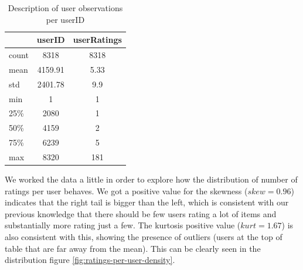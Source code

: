 \documentclass[letterpaper, 10 pt, conference]{ieeeconf}  %
\begin{document}
\begin{enumerate}
\begin{itemize}
        \begin{table}[]
        \begin{tabular}{@{}l|c|c|@{}}
        \cmidrule & \cellcolor[HTML]{DAE8FC}userID & \cellcolor[HTML]{DAE8FC}userRatings \\ \midrule
        \multicolumn{1}{|l|}{\cellcolor[HTML]{DAE8FC}count} & 8318                           & 8318                                \\ \midrule
        \multicolumn{1}{|l|}{\cellcolor[HTML]{DAE8FC}mean}  & 4159.91                        & 5.33                                \\ \midrule
        \multicolumn{1}{|l|}{\cellcolor[HTML]{DAE8FC}std}   & 2401.78                        & 9.9                                 \\ \midrule
        \multicolumn{1}{|l|}{\cellcolor[HTML]{DAE8FC}min}   & 1                              & 1                                   \\ \midrule
        \multicolumn{1}{|l|}{\cellcolor[HTML]{DAE8FC}25\%}  & 2080                           & 1                                   \\ \midrule
        \multicolumn{1}{|l|}{\cellcolor[HTML]{DAE8FC}50\%}  & 4159                           & 2                                   \\ \midrule
        \multicolumn{1}{|l|}{\cellcolor[HTML]{DAE8FC}75\%}  & 6239                           & 5                                   \\ \midrule
        \multicolumn{1}{|l|}{\cellcolor[HTML]{DAE8FC}max}   & 8320                           & 181                                 \\ \bottomrule
        \end{tabular}
        \caption{Description of user observations per userID}
        \label{table:userid-itemid-description}
        \end{table}
        
        We worked the data a little in order to explore how the distribution of number of ratings per user behaves. We got a positive value for the skewness ($skew=0.96$) indicates that the right tail is bigger than the left, which is consistent with our previous knowledge that there should be few users rating a lot of items and substantially more rating just a few. The kurtosis positive value ($kurt=1.67$) is also consistent with this, showing the presence of outliers (users at the top of table that are far away from the mean). This can be clearly seen in the distribution figure \ref{fig:ratings-per-user-density}.
        

\end{itemize}
\end{enumerate}
\end{document}

